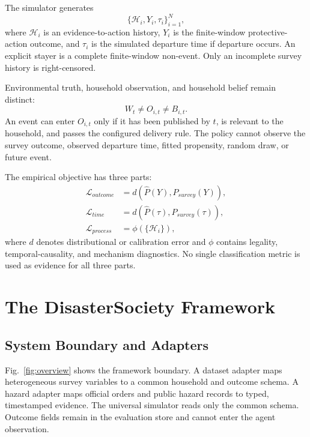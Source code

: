 \documentclass[journal]{IEEEtran}
\newcommand{\method}{DisasterSociety}
\begin{document}
The simulator generates
\begin{equation}
\{\mathcal{H}_i,Y_i,\tau_i\}_{i=1}^{N},
\end{equation}
where $\mathcal{H}_i$ is an evidence-to-action history, $Y_i$ is the
finite-window protective-action outcome, and $\tau_i$ is the simulated
departure time if departure occurs. An explicit stayer is a complete
finite-window non-event. Only an incomplete survey history is right-censored.

Environmental truth, household observation, and household belief remain
distinct:
\begin{equation}
W_t \neq O_{i,t} \neq B_{i,t}.
\label{eq:truth-observation-belief}
\end{equation}
An event can enter $O_{i,t}$ only if it has been published by $t$, is relevant
to the household, and passes the configured delivery rule. The policy cannot
observe the survey outcome, observed departure time, fitted propensity, random
draw, or future event.

The empirical objective has three parts:
\begin{align}
\mathcal{L}_{outcome} &=
  d\!\left(\widehat{P}(Y),P_{survey}(Y)\right),\\
\mathcal{L}_{time} &=
  d\!\left(\widehat{P}(\tau),P_{survey}(\tau)\right),\\
\mathcal{L}_{process} &=
  \phi(\{\mathcal{H}_i\}),
\end{align}
where $d$ denotes distributional or calibration error and $\phi$ contains
legality, temporal-causality, and mechanism diagnostics. No single
classification metric is used as evidence for all three parts.

\section{The \method{} Framework}
\label{sec:framework}
\subsection{System Boundary and Adapters}
Fig.~\ref{fig:overview} shows the framework boundary. A dataset adapter maps
heterogeneous survey variables to a common household and outcome schema. A
hazard adapter maps official orders and public hazard records to typed,
timestamped evidence. The universal simulator reads only the common schema.
Outcome fields remain in the evaluation store and cannot enter the agent
observation.
\end{document}
